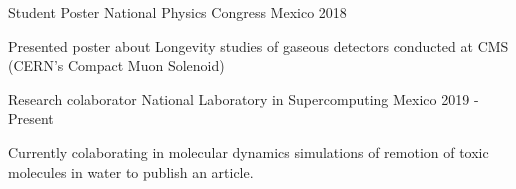 
\begin{cventries}
  \cventry
    {Student Poster} %
    {National Physics Congress} %
    {Mexico} %
    {2018} %
    {
      \begin{cvitems} %
        \item Presented poster about Longevity studies of gaseous detectors conducted at CMS (CERN's Compact Muon Solenoid)
      \end{cvitems}
    }
  \cventry
    {Research colaborator} %
    {National Laboratory in Supercomputing} %
    {Mexico} %
    {2019 - Present} %
    {
      \begin{cvitems} %
        \item Currently colaborating in molecular dynamics simulations of remotion of toxic molecules in water to publish an article.
      \end{cvitems}
    }
\end{cventries}
